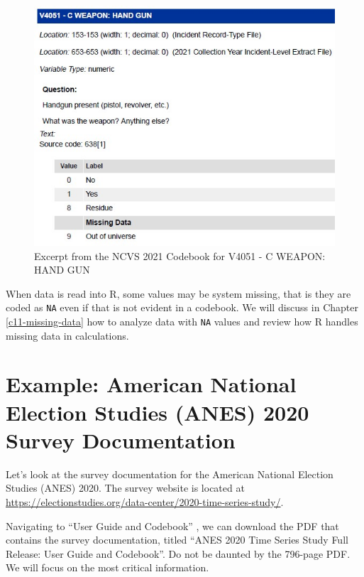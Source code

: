 \documentclass[
]{krantz}
\begin{document}
\begin{figure}
\includegraphics{images/codebook-ncvs-weapon-handgun} \caption{Excerpt from the NCVS 2021 Codebook for V4051 - C WEAPON: HAND GUN}\label{fig:understand-ncvs-weapon-cb-hg}
\end{figure}

When data is read into R, some values may be system missing, that is they are coded as \texttt{NA} even if that is not evident in a codebook. We will discuss in Chapter \ref{c11-missing-data} how to analyze data with \texttt{NA} values and review how R handles missing data in calculations.

\hypertarget{example-american-national-election-studies-anes-2020-survey-documentation}{%
\section{Example: American National Election Studies (ANES) 2020 Survey Documentation}\label{example-american-national-election-studies-anes-2020-survey-documentation}}

Let's look at the survey documentation for the American National Election Studies (ANES) 2020. The survey website is located at \url{https://electionstudies.org/data-center/2020-time-series-study/}.

Navigating to ``User Guide and Codebook'' \citep{anes-cb}, we can download the PDF that contains the survey documentation, titled ``ANES 2020 Time Series Study Full Release: User Guide and Codebook''. Do not be daunted by the 796-page PDF. We will focus on the most critical information.
\end{document}
